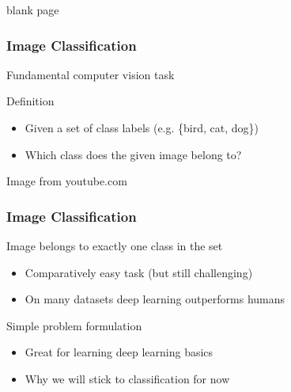 \documentclass[xetex,professionalfont]{beamer}
\renewcommand\emph[1]{\textcolor{tuwcvl_cvl_blue}{#1}}
\begin{document}
{
\begin{frame}


\begin{center}
\textcolor[rgb]{0.9,0.9,0.9}{blank page}
\end{center}

\end{frame}
}


\begin{frame}
\frametitle{Image Classification}

Fundamental computer vision task

\bigskip

Definition
\begin{itemize}
    \item Given a set of \emph{class labels} (e.g. \{bird, cat, dog\})
    \item Which class does the given image belong to?
\end{itemize}

\begin{center}
    {\centering Image from youtube.com}
\end{center}

\end{frame}


\begin{frame}
\frametitle{Image Classification}

Image belongs to exactly one class in the set
\begin{itemize}
    \item Comparatively easy task (but still challenging)
    \item On many datasets deep learning outperforms humans
\end{itemize}

\bigskip

Simple problem formulation
\begin{itemize}
    \item Great for learning deep learning basics
    \item Why we will stick to classification for now
\end{itemize}

\end{frame}
\end{document}
